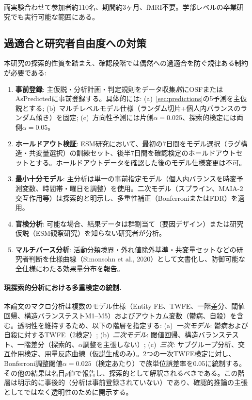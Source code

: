 \documentclass[a4paper,11pt,titlepage]{article}
\begin{document}
両実験合わせて参加者約110名、期間約3ヶ月、fMRI不要。学部レベルの卒業研究でも実行可能な範囲にある。

\subsection{過適合と研究者自由度への対策}\label{sec:safeguards}

本研究の探索的性質を踏まえ、確認段階では偶然への過適合を防ぐ規律ある制約が必要である:

\begin{enumerate}
  \item \textbf{事前登録}: 主仮説・分析計画・判定規則をデータ収集\emph{前}にOSFまたはAsPredictedに事前登録する。具体的には: (a)~\cref{sec:predictions}の5予測を主仮説とする; (b)~マルチレベルモデル仕様（ランダム切片+個人内バランスのランダム傾き）を固定; (c)~方向性予測には片側$\alpha = 0.025$、探索的検定には両側$\alpha = 0.05$。
  \item \textbf{ホールドアウト検証}: ESM研究において、最初の7日間をモデル選択（ラグ構造・共変量選択）の訓練セット、後半7日間を確認検定のホールドアウトセットとする。ホールドアウトデータを確認した後のモデル仕様変更は不可。
  \item \textbf{最小十分モデル}: 主分析は単一の事前指定モデル（個人内バランスを時変予測変数、時間帯・曜日を調整）を使用。二次モデル（スプライン、MAIA-2交互作用等）は探索的と明示し、多重性補正（BonferroniまたはFDR）を適用。
  \item \textbf{盲検分析}: 可能な場合、結果データは群割当て（要因デザイン）または研究仮説（ESM観察研究）を知らない研究者が分析。
  \item \textbf{マルチバース分析}: 活動分類境界・外れ値除外基準・共変量セットなどの研究者判断を仕様曲線（Simonsohn et al., 2020）として文書化し、防御可能な全仕様にわたる効果量分布を報告。
\end{enumerate}

\paragraph{現探索的分析における多重検定の統制.}
本論文のマクロ分析は複数のモデル仕様（Entity FE、TWFE、一階差分、閾値回帰、構造バランステストM1--M5）およびアウトカム変数（鬱病、自殺）を含む。透明性を維持するため、以下の階層を指定する: (a)~\textit{一次モデル}: 鬱病および自殺に対するTWFE（2検定）; (b)~\textit{二次モデル}: 閾値回帰、構造バランステスト、一階差分（探索的、$\alpha$調整を主張しない）; (c)~\textit{三次}: サブグループ分析、交互作用検定、用量反応曲線（仮説生成のみ）。2つの一次TWFE検定に対し、Bonferroni調整閾値$\alpha = 0.025$（検定あたり）で族単位誤差率を0.05に統制する。その他の結果は名目$p$値で報告し、探索的として解釈されるべきである。この階層は明示的に事後的（分析は事前登録されていない）であり、確認的推論の主張としてではなく透明性のために開示する。
\end{document}
